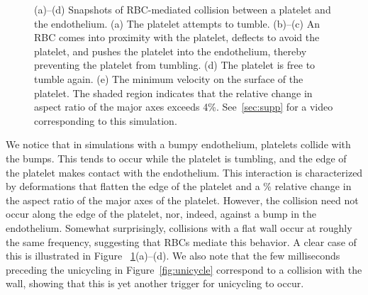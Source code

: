 \begin{figure}[th!]
    \vspace{11pt}

    \begin{subfigure}[t]{\textwidth}
    \end{subfigure}
    \caption[RBC-mediated platelet-endothelial collision]{%
(a)--(d) Snapshots of RBC-mediated collision between a platelet and the endothelium. (a)
The platelet attempts to tumble. (b)--(c) An RBC comes into proximity with the platelet,
deflects to avoid the platelet, and pushes the platelet into the endothelium, thereby
preventing the platelet from tumbling. (d) The platelet is free to tumble again. (e) The
minimum velocity on the surface of the platelet. The shaded region indicates that the
relative change in aspect ratio of the major axes exceeds 4\%. See~\ref{sec:supp} for a
video corresponding to this simulation.
    }\label{fig:rbc-plt-endo-collision}
\end{figure}

We notice that in simulations with a bumpy endothelium, platelets collide with the bumps.
This tends to occur while the platelet is tumbling, and the edge of the platelet makes
contact with the endothelium. This interaction is characterized by deformations that
flatten the edge of the platelet and a \% relative change in the aspect ratio
of the major axes of the platelet. However, the collision need not occur along the edge
of the platelet, nor, indeed, against a bump in the endothelium. Somewhat surprisingly,
collisions with a flat wall occur at roughly the same frequency, suggesting that RBCs
mediate this behavior. A clear case of this is illustrated in Figure~%
\ref{fig:rbc-plt-endo-collision}(a)--(d). We also note that the few milliseconds
preceding the unicycling in Figure~\ref{fig:unicycle} correspond to a collision with the
wall, showing that this is yet another trigger for unicycling to occur.

